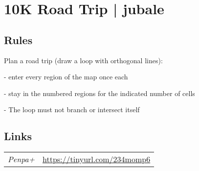 \section[10K Road Trip | jubale {[\emph{Road Trip}]}]{10K Road Trip | {\normalfont jubale}}
\label{sec:26-10k-road-trip-jubale}

\subsection*{Rules}
\begin{markdown}
Plan a road trip (draw a loop with orthogonal lines):

- enter every region of the map once each

- stay in the numbered regions for the indicated number of cells 

- The loop must not branch or intersect itself
\end{markdown}
\subsection*{Links}
\begin{tabularx}{\textwidth}{l X}
\emph{Penpa+} & \url{https://tinyurl.com/234momp6} \\
\end{tabularx}
\pagebreak
